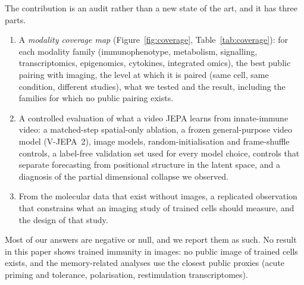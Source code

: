 The contribution is an audit rather than a new state of the art, and it has three parts.
\begin{enumerate}
\item A \emph{modality coverage map} (Figure~\ref{fig:coverage}, Table~\ref{tab:coverage}):
for each modality family (immunophenotype, metabolism, signalling, transcriptomics,
epigenomics, cytokines, integrated omics), the best public pairing with imaging, the level
at which it is paired (same cell, same condition, different studies), what we tested and
the result, including the families for which no public pairing exists.
\item A controlled evaluation of what a video JEPA learns from innate-immune video: a
matched-step spatial-only ablation, a frozen general-purpose video model (V-JEPA~2), image
models, random-initialisation and frame-shuffle controls, a label-free validation set used
for every model choice, controls that separate forecasting from positional structure in the
latent space, and a diagnosis of the partial dimensional collapse we observed.
\item From the molecular data that exist without images, a replicated observation that
constrains what an imaging study of trained cells should measure, and the design of that
study.
\end{enumerate}
Most of our answers are negative or null, and we report them as such. No result in this
paper shows trained immunity in images: no public image of trained cells exists, and the
memory-related analyses use the closest public proxies (acute priming and tolerance,
polarisation, restimulation transcriptomes).
